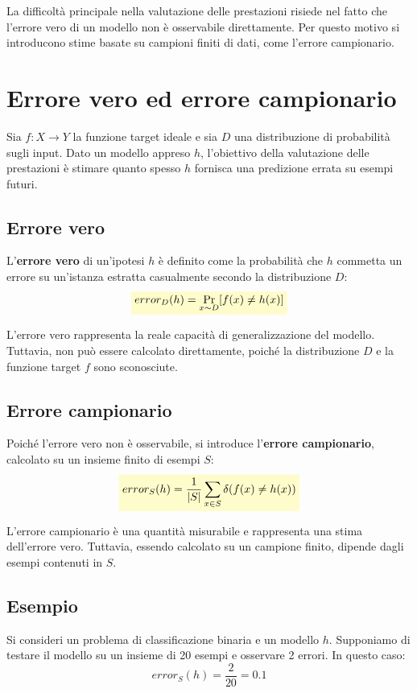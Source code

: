 \documentclass[a4paper,12pt]{report}
\newcommand{\highlight}[1]{%
\colorbox{yellow!20}{$\displaystyle #1$}%
}
\begin{document}
La difficoltà principale nella valutazione delle prestazioni risiede nel fatto che l’errore vero di un modello non è osservabile direttamente.
Per questo motivo si introducono stime basate su campioni finiti di dati, come l’errore campionario.

\section{Errore vero ed errore campionario}

Sia \( f : X \rightarrow Y \) la funzione target ideale e sia \( D \) una distribuzione di probabilità sugli input.
Dato un modello appreso \( h \), l’obiettivo della valutazione delle prestazioni è stimare quanto spesso \( h \) fornisca una predizione errata su esempi futuri.

\subsection{Errore vero}

L’\textbf{errore vero} di un’ipotesi \( h \) è definito come la probabilità che \( h \) commetta un errore su un’istanza estratta casualmente secondo la distribuzione \( D \):
\[
\highlight{error_D(h) = \Pr_{x \sim D}[f(x) \neq h(x)]}
\]

L’errore vero rappresenta la reale capacità di generalizzazione del modello.
Tuttavia, non può essere calcolato direttamente, poiché la distribuzione \( D \) e la funzione target \( f \) sono sconosciute.

\subsection{Errore campionario}

Poiché l’errore vero non è osservabile, si introduce l’\textbf{errore campionario}, calcolato su un insieme finito di esempi \( S \):
\[
\highlight{
error_S(h) = \frac{1}{|S|} \sum_{x \in S} \delta(f(x) \neq h(x))
}
\]

L’errore campionario è una quantità misurabile e rappresenta una stima dell’errore vero.
Tuttavia, essendo calcolato su un campione finito, dipende dagli esempi contenuti in \( S \).

\subsection*{Esempio}

Si consideri un problema di classificazione binaria e un modello \( h \).
Supponiamo di testare il modello su un insieme di 20 esempi e osservare 2 errori.
In questo caso:
\[
error_S(h) = \frac{2}{20} = 0.1
\]
\end{document}
